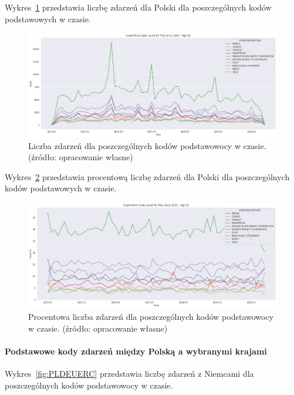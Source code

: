 \documentclass[11pt]{report}
\begin{document}
    Wykres~\ref{fig:PLPERCinTIME} przedstawia liczbę zdarzeń dla Polski dla poszczególnych kodów podstawowych w czasie.
    \begin{figure}[ht!]
        \centering
        \includegraphics[width=1 \textwidth]{fig/PL/PLERCinTIME.png}
        \caption{Liczba zdarzeń dla poszczególnych kodów podstawowocy w czasie. (źródło: opracowanie własne)}
        \label{fig:PLPERCinTIME}
    \end{figure}

    Wykres~\ref{fig:PLPERCpercinTIME} przedstawia procentową liczbę zdarzeń dla Polski dla poszczególnych kodów podstawowych w czasie.
    \begin{figure}[ht!]
        \centering
        \includegraphics[width=1 \textwidth]{fig/PL/PLERCpercinTIME.png}
        \caption{Procentowa liczba zdarzeń dla poszczególnych kodów podstawowocy w czasie. (źródło: opracowanie własne)}
        \label{fig:PLPERCpercinTIME}
    \end{figure}

    \paragraph{Podstawowe kody zdarzeń między Polską a wybranymi krajami}

    Wykres~\ref{fig:PLDEUERC} przedstawia liczbę zdarzeń z Niemcami dla poszczególnych kodów podstawowocy w czasie.
\end{document}
